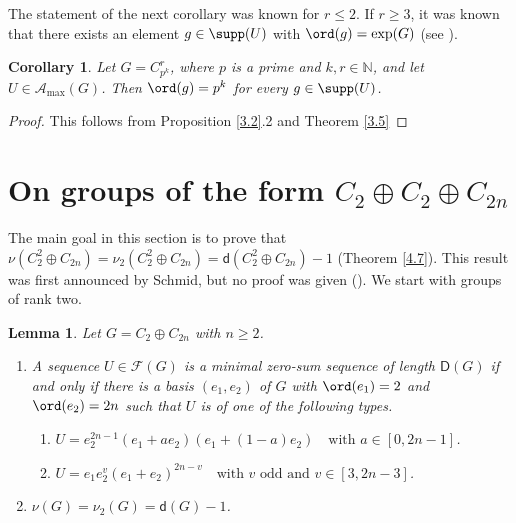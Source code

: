 \documentclass[a4paper, 10pt]{amsart}
\theoremstyle{plain}
\newtheorem{lemma}[theorem]{\bf Lemma}
\newtheorem{corollary}[theorem]{\bf Corollary}
\theoremstyle{definition}
\newcommand{\N}{\mathbb N}
\numberwithin{equation}{section}
\begin{document}
The statement of the next corollary was known  for $r \le 2$. If $r \ge 3$, it was known that there exists an element $g \in \supp (U)$ with $\ord (g) = \exp (G)$ (see \cite[Appendix B, Problem 4]{Ge-Gr-Zh26a}).

\begin{corollary} \label{3.6}
Let $G = C_{p^k}^r$, where $p$ is a prime and $k, r \in \N$, and let $U \in \mathcal A_{\max} (G)$. Then $\ord (g) = p^k$ for every $g \in \supp (U)$.
\end{corollary}

\begin{proof}
This follows from Proposition \ref{3.2}.2 and Theorem \ref{3.5}
\end{proof}

\smallskip
\section{On groups of the form $C_2 \oplus C_2 \oplus C_{2n}$} \label{4}
\smallskip

The main goal in this section is to prove that $\nu (C_2^2 \oplus C_{2n}) = \nu_2 (C_2^2 \oplus C_{2n}) = \mathsf d (C_2^2 \oplus C_{2n}) - 1$ (Theorem \ref{4.7}). This result was first announced by Schmid, but no proof was given (\cite[Lemma  4.3]{Sc11b}). We start with groups of rank two.


\begin{lemma}\label{4.1}
Let $G = C_2 \oplus C_{2n}$ with $n\geq 2$.
\begin{enumerate}
\item A sequence $U \in \mathcal F (G)$ is a minimal zero-sum sequence of length $\mathsf D (G)$ if and only if there is a basis $(e_1, e_2)$ of $G$ with $\ord (e_1)=2$ and $\ord (e_2) = 2n$ such that $U$ is of one of the following types.
    \begin{enumerate}
	\item[(a)] $U  = e_2^{2n - 1}  (e_1 + a e_2)  (e_1 + (1 - a) e_2) \quad \text{with } a \in [0,  2n - 1]$.

	\item[(b)] $ U  = e_1  e_2^v (e_1 + e_2)^{2n - v} \quad \text{with } v \text{ odd and }  v \in [3, 2n - 3]$.
\end{enumerate}

\smallskip
\item $\nu (G) = \nu_2 (G) = \mathsf d (G)-1$.
\end{enumerate} 
\end{lemma}
\end{document}
